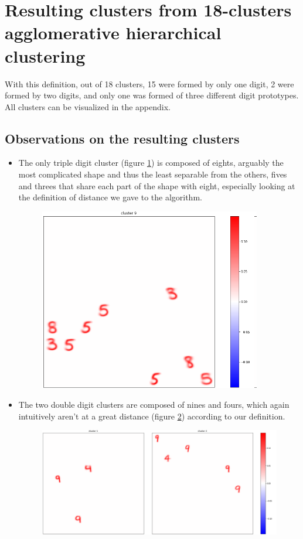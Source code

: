 \documentclass[a4paper]{report}
\begin{document}
\section{Resulting clusters from 18-clusters agglomerative hierarchical clustering}


With this definition, out of 18 clusters, 15 were formed by only one digit, 2 were formed by two digits, and only one was formed of three different digit prototypes.
All clusters can be visualized in the appendix.


\subsection{Observations on the resulting clusters}

\begin{itemize}
    \item The only triple digit cluster (figure \ref{910}) is composed of eights, arguably the most complicated shape and thus the least separable from the others, fives and threes that share each part of the shape with eight, especially looking at the definition of distance we gave to the algorithm.

\begin{figure} [H]
    \centering
    \includegraphics [width=9.7cm] {c/h/9half.png}
    \caption{}
    \label{910}
\end{figure}

    \item The two double digit clusters are composed of nines and fours, which again intuitively aren't at a great distance (figure \ref{12}) according to our definition.

\begin{figure} [H]
    \centering
    \includegraphics [width=\textwidth ] {c/h/1.png}
    \caption{}
    \label{12}
\end{figure}


\end{itemize}
\end{document}
